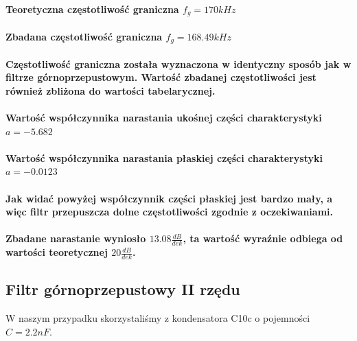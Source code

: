 \documentclass[a4paper,12pt]{article}
\begin{document}
\begin{justify}
\paragraph{Teoretyczna częstotliwość graniczna $f_{g} = 170kHz$}
\paragraph{Zbadana częstotliwość graniczna $f_{g} = 168.49kHz$}

\paragraph{Częstotliwość graniczna została wyznaczona w identyczny sposób jak w filtrze górnoprzepustowym. Wartość zbadanej częstotliwości jest również zbliżona do wartości tabelarycznej.}

\paragraph{Wartość współczynnika narastania ukośnej części charakterystyki $a = -5.682$}
\paragraph{Wartość współczynnika narastania płaskiej części charakterystyki $a = -0.0123$}

\paragraph{Jak widać powyżej współczynnik części płaskiej jest bardzo mały, a więc filtr przepuszcza dolne częstotliwości zgodnie z oczekiwaniami. }

\paragraph{Zbadane narastanie wyniosło $13.08 \frac{dB}{dek}$, ta wartość wyraźnie odbiega od wartości teoretycznej $20 \frac{dB}{dek}$.}

\newpage

\subsection{Filtr górnoprzepustowy II rzędu}

W naszym przypadku skorzystaliśmy z kondensatora C10c o pojemności $C = 2.2nF$. 


\end{justify}
\end{document}
